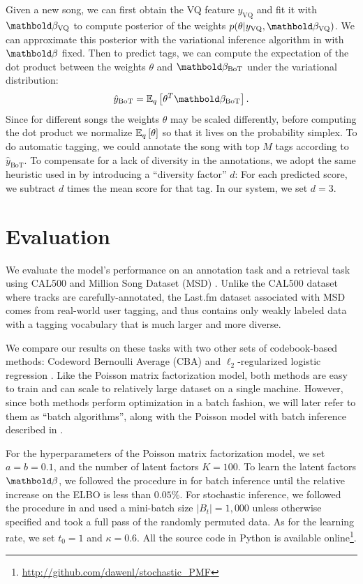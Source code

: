 Given a new song, we can first obtain the VQ feature $y_{\text{VQ}}$ and fit it with $\mb{\beta}_{\text{VQ}}$ to compute posterior of the weights $p(\theta | y_{\text{VQ}}, \mb{\beta}_{\text{VQ}})$. We can approximate this posterior with the variational inference algorithm in  with $\mb{\beta}$ fixed. Then to predict tags, we can compute the expectation of the dot product between the weights $\theta$ and $\mb{\beta}_{\text{BoT}}$ under the variational distribution: 
\begin{equation} \label{chpt:tagging:eq:score}
\hat{y}_{\text{BoT}} = \EE{q}{\theta^T \mb{\beta}_{\text{BoT}}}.
\end{equation}
Since for different songs the weights $\theta$ may be scaled differently, before computing the dot product we normalize $\mathbb{E}_{q}\left[\theta\right]$ so that it lives on the probability simplex. To do automatic tagging, we could annotate the song with top $M$ tags according to $\hat{y}_{\text{BoT}}$. To compensate for a lack of diversity in the annotations, we adopt the same heuristic used in \cite{hoffman2009easy} by introducing a ``diversity factor'' $d$: For each predicted score, we subtract $d$ times the mean score for that tag. In our system, we set $d = 3$.

\section{Evaluation}\label{chpt:tagging:sec:exp}
We evaluate the model's performance on an annotation task and a retrieval task using CAL500 \citep{Turnbull_SemanticAudio} and Million Song Dataset (MSD) \citep{bertin2011million}. Unlike the CAL500 dataset where tracks are carefully-annotated, the Last.fm dataset associated with MSD comes from real-world user tagging, and thus contains only weakly labeled data with a tagging vocabulary that is much larger and more diverse.

We compare our results on these tasks with two other sets of codebook-based methods: Codeword Bernoulli Average (CBA) \citep{hoffman2009easy} and $\ell_2$-regularized logistic regression \citep{xie2011music}. Like the Poisson matrix factorization model, both methods are easy to train and can scale to relatively large dataset on a single machine. However, since both methods perform optimization in a batch fashion, we will later refer to them as ``batch algorithms'', along with the Poisson model with batch inference described in .

For the hyperparameters of the Poisson matrix factorization model, we set $a = b = 0.1$, and the number of latent factors $K = 100$. To learn the latent factors $\mb{\beta}$, we followed the procedure in  for batch inference until the relative increase on the \gls{ELBO} is less than $0.05\%$. For stochastic inference, we followed the procedure in  and used a mini-batch size $|B_t| = 1,000$ unless otherwise specified and took a full pass of the randomly permuted data. As for the learning rate, we set $t_0 = 1$ and $\kappa = 0.6$. All the source code in Python is available online\footnote{\url{http://github.com/dawenl/stochastic_PMF}}.

